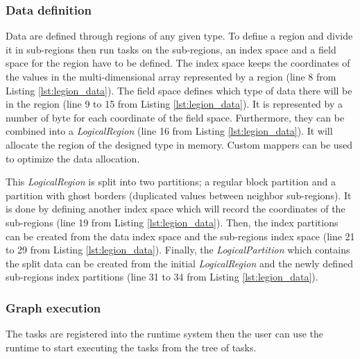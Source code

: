 \subsubsection{Data definition}
Data are defined through regions of any given type.
To define a region and divide it in sub-regions then run tasks on the sub-regions, an index space and a field space for the region have to be defined.
The index space keeps the coordinates of the values in the multi-dimensional array represented by a region (line 8 from Listing \ref{lst:legion_data}).
The field space defines which type of data there will be in the region (line 9 to 15 from Listing \ref{lst:legion_data}).
It is represented by a number of byte for each coordinate of the field space.
Furthermore, they can be combined into a \textit{LogicalRegion}  (line 16 from Listing \ref{lst:legion_data}).
It will allocate the region of the designed type in memory.
Custom mappers can be used to optimize the data allocation.

This \textit{LogicalRegion} is split into two partitions; a regular block partition and a partition with ghost borders (duplicated values between neighbor sub-regions).
It is done by defining another index space which will record the coordinates of the sub-regions (line 19 from Listing \ref{lst:legion_data}).
Then, the index partitions can be created from the data index space and the sub-regions index space (line 21 to 29 from Listing \ref{lst:legion_data}).
Finally, the \textit{LogicalPartition} which contains the split data can be created from the initial \textit{LogicalRegion} and the newly defined sub-regions index partitions (line 31 to 34 from Listing \ref{lst:legion_data}).


\subsubsection{Graph execution}
The tasks are registered into the runtime system then the user can use the runtime to start executing the tasks from the tree of tasks.

\begin{figure}

\end{figure}

